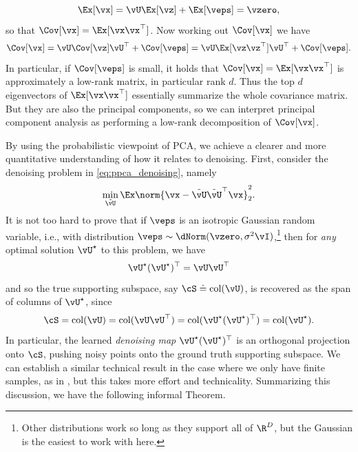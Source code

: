 \documentclass[../../book-main.tex]{subfiles}
\begin{document}
\begin{equation}
    \Ex[\vx] = \vU\Ex[\vz] + \Ex[\veps] = \vzero,
\end{equation}
so that \(\Cov[\vx] = \Ex[\vx\vx^{\top}]\). Now working out \(\Cov[\vx]\) we have 
\begin{equation}
    \Cov[\vx] = \vU\Cov[\vz]\vU^{\top} + \Cov[\veps] = \vU\Ex[\vz\vz^{\top}]\vU^{\top} + \Cov[\veps].
\end{equation}
In particular, if \(\Cov[\veps]\) is small, it holds that \(\Cov[\vx] = \Ex[\vx\vx^{\top}]\) is approximately a low-rank matrix, in particular rank \(d\). Thus the top \(d\) eigenvectors of \(\Ex[\vx\vx^{\top}]\) essentially summarize the whole covariance matrix. But they are also the principal components, so we can interpret principal component analysis as performing a low-rank decomposition of \(\Cov[\vx]\).

\begin{remark}
    By using the probabilistic viewpoint of PCA, we achieve a clearer and more quantitative understanding of how it relates to denoising. First, consider the denoising problem in \eqref{eq:ppca_denoising}, namely
    \begin{equation}
        \min_{\tilde{\vU}}\Ex\norm{\vx - \tilde{\vU}\tilde{\vU}^{\top}\vx}_{2}^{2}.
    \end{equation}
    It is not too hard to prove that if \(\veps\) is an isotropic Gaussian
    random variable, i.e., with distribution \(\veps \sim \dNorm(\vzero,
    \sigma^{2}\vI)\),\footnote{Other distributions work so long as they support
    all of \(\R^{D}\), but the Gaussian is the easiest to work with here.} then
    for \textit{any} optimal solution \(\vU^{\star}\) to this problem, we have 
    \begin{equation}
        \vU^{\star}(\vU^{\star})^{\top} = \vU\vU^{\top}
    \end{equation}
    and so the true supporting subspace, say \(\cS \doteq \mathop{\mathrm{col}}(\vU)\), is
    recovered as the span of columns of \(\vU^{\star}\), since 
    \begin{equation}
        \cS = \mathop{\mathrm{col}}(\vU) = \mathop{\mathrm{col}}(\vU\vU^{\top})
        = \mathop{\mathrm{col}}(\vU^{\star}(\vU^{\star})^{\top})
        = \mathop{\mathrm{col}}(\vU^{\star}).
    \end{equation}
    In particular, the learned \textit{denoising map} \(\vU^{\star}(\vU^{\star})^{\top}\) is an orthogonal projection onto \(\cS\), pushing noisy points onto the ground truth supporting subspace. We can establish a similar technical result in the case where we only have finite samples, as in , but this takes more effort and technicality. Summarizing this discussion, we have the following informal Theorem.
\end{remark}
\end{document}
